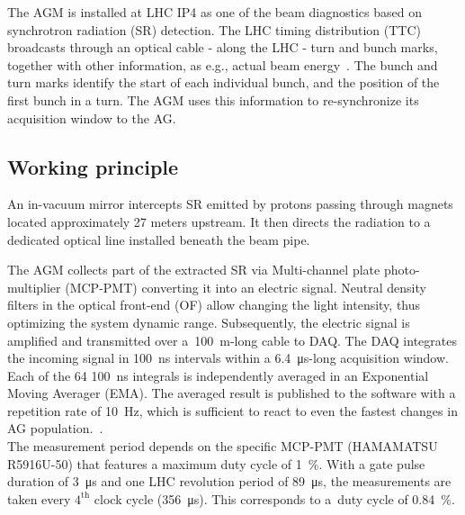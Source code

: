 %
The AGM is installed at LHC IP4 as one of the beam diagnostics based on synchrotron radiation (SR) detection. %
%
The LHC timing distribution (TTC) broadcasts through an optical cable - along the LHC - turn and bunch marks, together with other information, as e.g., actual beam energy~\cite{ttc_distribution}.
%
The bunch and turn marks identify the start of each individual bunch, and the position of the first bunch in a turn.   
%
The AGM uses this information to re-synchronize its acquisition window to the AG.
%
\subsection{Working principle}
%
An in-vacuum mirror intercepts  SR  emitted by protons passing through magnets located approximately 27 meters upstream. It then directs the radiation to a dedicated optical line installed beneath the beam pipe.

%
The AGM collects part of the extracted SR via Multi-channel plate photo-multiplier (MCP-PMT) converting it into an electric signal.
%
Neutral density filters in the optical front-end (OF) allow  changing the light intensity, thus optimizing the system dynamic range.
% 
Subsequently, the electric signal is amplified and transmitted over a~\SI{100}{m}-long cable to DAQ.
%
The DAQ integrates the incoming signal in \SI{100}{\nano\second} intervals within a \SI{6.4}{\micro\second}-long acquisition window.
%
Each of the 64 \SI{100}{\nano\second} integrals is independently averaged in an Exponential Moving Averager (EMA).
%
The averaged result is published to the software with a repetition rate of \SI{10}{Hz}, which is sufficient to react to even the fastest changes in AG population.~\cite{high_sensitivity_measurement}.
%
\\
The measurement period depends on the specific MCP-PMT (HAMAMATSU R5916U-50) that features a maximum duty cycle of \SI{1}{\%}. 
%
%
%
With a gate pulse duration of \SI{3}{\micro\second} and one LHC revolution period of \SI{89}{\micro\second}, the measurements are taken every $4^{\text{th}}$ clock cycle (\SI{356}{\micro\second}).
%
This corresponds to a~duty cycle of \SI{0.84}{\%}.
\\
%

